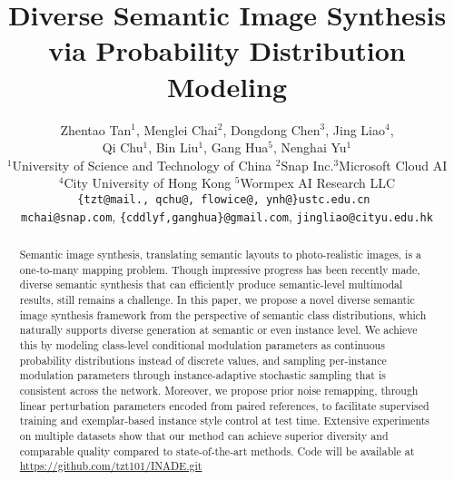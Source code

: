 \documentclass[final]{cvpr}
\begin{document}
\title{Diverse Semantic Image Synthesis via Probability Distribution Modeling}

\author{Zhentao Tan$^{1}$, Menglei Chai$^{2}$, Dongdong Chen$^{3}$, Jing Liao$^{4}$, \\ Qi Chu$^{1}$, Bin Liu$^{1}$, Gang Hua$^{5}$, Nenghai Yu$^{1}$\\
$^{1}$University of Science and Technology of China \quad 
$^{2}$Snap Inc.\quad$^3$Microsoft Cloud AI\\
$^4$City University of Hong Kong
\quad$^5$Wormpex AI Research LLC\\
{\tt\small\{tzt@mail., qchu@, flowice@, ynh@\}ustc.edu.cn }\\
{\tt\small mchai@snap.com}, 
{\tt\small \{cddlyf,ganghua\}@gmail.com},
{\tt\small jingliao@cityu.edu.hk}
}

\maketitle


\begin{abstract}
Semantic image synthesis, translating semantic layouts to photo-realistic images, is a one-to-many mapping problem.
Though impressive progress has been recently made, diverse semantic synthesis that can efficiently produce semantic-level multimodal results, still remains a challenge.
In this paper, we propose a novel diverse semantic image synthesis framework from the perspective of semantic class distributions, which naturally supports diverse generation at semantic or even instance level. We achieve this by modeling class-level conditional modulation parameters as continuous probability distributions instead of discrete values, and sampling per-instance modulation parameters through instance-adaptive stochastic sampling that is consistent across the network. Moreover, we propose prior noise remapping, through linear perturbation parameters encoded from paired references, to facilitate supervised training and exemplar-based instance style control at test time. Extensive experiments on multiple datasets show that our method can achieve superior diversity and comparable quality compared to state-of-the-art methods. Code will be available at \url{https://github.com/tzt101/INADE.git}
\end{abstract}
\end{document}
